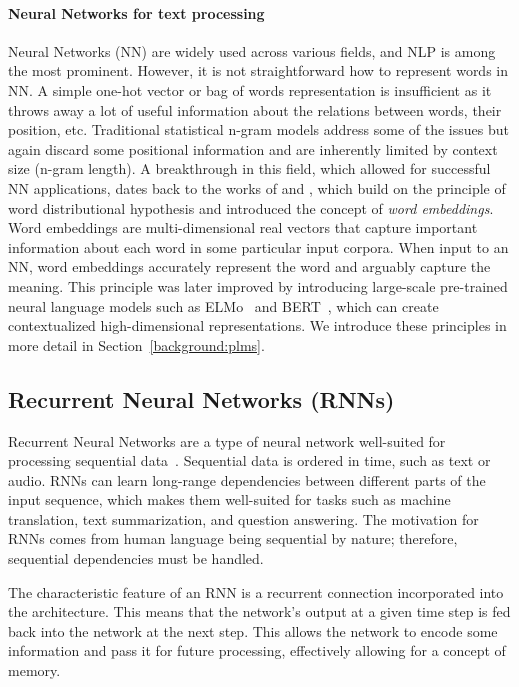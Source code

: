 \paragraph{Neural Networks for text processing}
Neural Networks (NN) are widely used across various fields, and NLP is among the most prominent.
However, it is not straightforward how to represent words in NN.
A simple one-hot vector or bag of words representation is insufficient as it throws away a lot of useful information about the relations between words, their position, etc.
Traditional statistical n-gram models \cite{jurafsky2000speech} address some of the issues but again discard some positional information and are inherently limited by context size (n-gram length).
A breakthrough in this field, which allowed for successful NN applications, dates back to the works of \citet{mikolov2010recurrent} and \citet{mikolov2013distributed}, which build on the principle of word distributional hypothesis and introduced the concept of \emph{word embeddings}.
Word embeddings are multi-dimensional real vectors that capture important information about each word in some particular input corpora.
When input to an NN, word embeddings accurately represent the word and arguably capture the meaning.
This principle was later improved by introducing large-scale pre-trained neural language models such as ELMo~\cite{peters-etal-2018-deep} and BERT~\cite{devlin2019}, which can create contextualized high-dimensional representations.
We introduce these principles in more detail in Section~\ref{background:plms}.

\subsection{Recurrent Neural Networks (RNNs)}
\label{background:rnns}
Recurrent Neural Networks are a type of neural network well-suited for processing sequential data~\cite{GoodBengCour16}. Sequential data is ordered in time, such as text or audio.
RNNs can learn long-range dependencies between different parts of the input sequence, which makes them well-suited for tasks such as machine translation, text summarization, and question answering.
The motivation for RNNs comes from human language being sequential by nature; therefore, sequential dependencies must be handled.

The characteristic feature of an RNN is a recurrent connection incorporated into the architecture.
This means that the network's output at a given time step is fed back into the network at the next step. This allows the network to encode some information and pass it for future processing, effectively allowing for a concept of memory.

